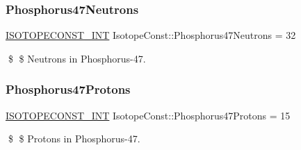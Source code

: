 \subsubsection{\texorpdfstring{Phosphorus47\+Neutrons}{Phosphorus47Neutrons}}
{\footnotesize\ttfamily \mbox{\hyperlink{group___isotope_const-_macros_ga5f18360b3e99483a35c32d789e62621c}{I\+S\+O\+T\+O\+P\+E\+C\+O\+N\+S\+T\+\_\+\+I\+NT}} Isotope\+Const\+::\+Phosphorus47\+Neutrons = 32}

\$ \$ Neutrons in Phosphorus-\/47. \mbox{\label{group___isotope_const-_phosphorus-_p47_ga89505fb76d85299783fc5fcc77eb1693}} 
\subsubsection{\texorpdfstring{Phosphorus47\+Protons}{Phosphorus47Protons}}
{\footnotesize\ttfamily \mbox{\hyperlink{group___isotope_const-_macros_ga5f18360b3e99483a35c32d789e62621c}{I\+S\+O\+T\+O\+P\+E\+C\+O\+N\+S\+T\+\_\+\+I\+NT}} Isotope\+Const\+::\+Phosphorus47\+Protons = 15}

\$ \$ Protons in Phosphorus-\/47. 